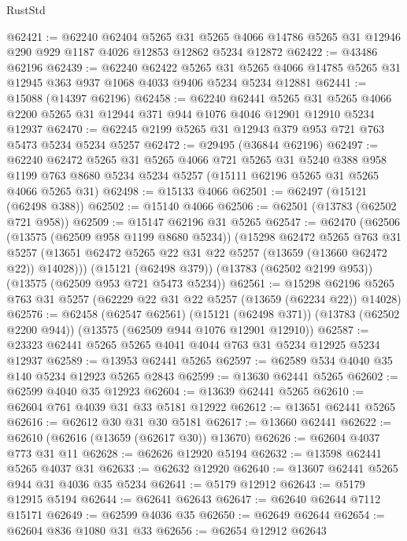 \begin{lexlean}{RustStd}
\begin{coremodule}
@62421 := @62240
    @62404
    @5265
    @31
    @5265
    @4066
    @14786
    @5265
    @31
    @12946
    @290
    @929
    @1187
    @4026
    @12853
    @12862
    @5234
    @12872
@62422 := @43486 @62196
@62439 := @62240
    @62422
    @5265
    @31
    @5265
    @4066
    @14785
    @5265
    @31
    @12945
    @363
    @937
    @1068
    @4033
    @9406
    @5234
    @5234
    @12881
@62441 := @15088 (@14397 @62196)
@62458 := @62240
    @62441
    @5265
    @31
    @5265
    @4066
    @2200
    @5265
    @31
    @12944
    @371
    @944
    @1076
    @4046
    @12901
    @12910
    @5234
    @12937
@62470 := @62245 @2199 @5265 @31 @12943 @379 @953 @721 @763 @5473 @5234 @5234 @5257
@62472 := @29495 (@36844 @62196)
@62497 := @62240
    @62472
    @5265
    @31
    @5265
    @4066
    @721
    @5265
    @31
    @5240
    @388
    @958
    @1199
    @763
    @8680
    @5234
    @5234
    @5257
    (@15111 @62196 @5265 @31 @5265 @4066 @5265 @31)
@62498 := @15133 @4066
@62501 := @62497 (@15121 (@62498 @388))
@62502 := @15140 @4066
@62506 := @62501 (@13783 (@62502 @721 @958))
@62509 := @15147 @62196 @31 @5265
@62547 := @62470
    (@62506
      (@13575 (@62509 @958 @1199 @8680 @5234))
      (@15298
        @62472
        @5265
        @763
        @31
        @5257
        (@13651 @62472 @5265 @22 @31 @22 @5257 (@13659 (@13660 @62472 @22)) @14028)))
    (@15121 (@62498 @379))
    (@13783 (@62502 @2199 @953))
    (@13575 (@62509 @953 @721 @5473 @5234))
@62561 := @15298 @62196 @5265 @763 @31 @5257 (@62229 @22 @31 @22 @5257 (@13659 (@62234 @22)) @14028)
@62576 := @62458
    (@62547 @62561)
    (@15121 (@62498 @371))
    (@13783 (@62502 @2200 @944))
    (@13575 (@62509 @944 @1076 @12901 @12910))
@62587 := @23323 @62441 @5265 @5265 @4041 @4044 @763 @31 @5234 @12925 @5234 @12937
@62589 := @13953 @62441 @5265
@62597 := @62589 @534 @4040 @35 @140 @5234 @12923 @5265 @2843
@62599 := @13630 @62441 @5265
@62602 := @62599 @4040 @35 @12923
@62604 := @13639 @62441 @5265
@62610 := @62604 @761 @4039 @31 @33 @5181 @12922
@62612 := @13651 @62441 @5265
@62616 := @62612 @30 @31 @30 @5181
@62617 := @13660 @62441
@62622 := @62610 (@62616 (@13659 (@62617 @30)) @13670)
@62626 := @62604 @4037 @773 @31 @11
@62628 := @62626 @12920 @5194
@62632 := @13598 @62441 @5265 @4037 @31
@62633 := @62632 @12920
@62640 := @13607 @62441 @5265 @944 @31 @4036 @35 @5234
@62641 := @5179 @12912
@62643 := @5179 @12915 @5194
@62644 := @62641 @62643
@62647 := @62640 @62644 @7112 @15171
@62649 := @62599 @4036 @35
@62650 := @62649 @62644
@62654 := @62604 @836 @1080 @31 @33
@62656 := @62654 @12912 @62643

\end{coremodule}
\end{lexlean}
